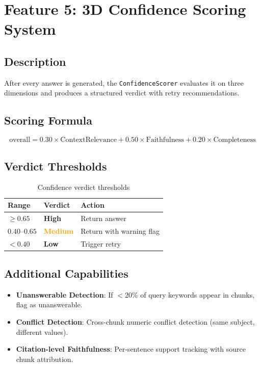 \documentclass[12pt, a4paper, oneside]{report}
\newcommand{\kw}[1]{\texttt{\small #1}}
\begin{document}
\section{Feature 5: 3D Confidence Scoring System}

\subsection*{Description}
After every answer is generated, the \kw{ConfidenceScorer} evaluates it on three dimensions
and produces a structured verdict with retry recommendations.

\subsection*{Scoring Formula}
\[
  \text{overall} = 0.30 \times \text{ContextRelevance}
                 + 0.50 \times \text{Faithfulness}
                 + 0.20 \times \text{Completeness}
\]

\subsection*{Verdict Thresholds}

\begin{table}[H]
\centering
{}
\begin{tabularx}{0.7\linewidth}{llX}
\toprule
\rowcolor{rapidblue!10}
\textbf{Range} & \textbf{Verdict} & \textbf{Action} \\
\midrule
$\geq 0.65$ & \textcolor{progreen}{\textbf{High}} & Return answer \\
$0.40$--$0.65$ & \textcolor{orange}{\textbf{Medium}} & Return with warning flag \\
$< 0.40$ & \textcolor{conred}{\textbf{Low}} & Trigger retry \\
\bottomrule
\end{tabularx}
\caption{Confidence verdict thresholds}
\end{table}

\subsection*{Additional Capabilities}
\begin{itemize}
  \item \textbf{Unanswerable Detection}: If $< 20\%$ of query keywords appear in chunks, flag as unanswerable.
  \item \textbf{Conflict Detection}: Cross-chunk numeric conflict detection (same subject, different values).
  \item \textbf{Citation-level Faithfulness}: Per-sentence support tracking with source chunk attribution.
\end{itemize}
\end{document}
